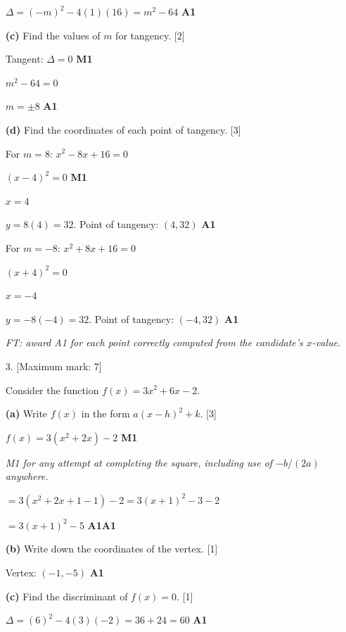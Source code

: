\documentclass[12pt, twoside]{article}
\begin{document}
\begin{enumerate}[itemsep=0.3cm]
$\Delta = (-m)^2 - 4(1)(16) = m^2 - 64$ \hfill \textbf{A1}

\medskip

\textbf{(c)} Find the values of $m$ for tangency. \hfill [2]

Tangent: $\Delta = 0$ \hfill \textbf{M1}

$m^2 - 64 = 0$

$m = \pm 8$ \hfill \textbf{A1}

\medskip

\textbf{(d)} Find the coordinates of each point of tangency. \hfill [3]

For $m = 8$: $x^2 - 8x + 16 = 0$

$(x - 4)^2 = 0$ \hfill \textbf{M1}

$x = 4$

$y = 8(4) = 32$. \quad Point of tangency: $(4, 32)$ \hfill \textbf{A1}

For $m = -8$: $x^2 + 8x + 16 = 0$

$(x + 4)^2 = 0$

$x = -4$

$y = -8(-4) = 32$. \quad Point of tangency: $(-4, 32)$ \hfill \textbf{A1}

\emph{FT: award A1 for each point correctly computed from the candidate's $x$-value.}

\newpage

\item[3.] [Maximum mark: 7]

Consider the function $f(x) = 3x^2 + 6x - 2$.

\medskip

\textbf{(a)} Write $f(x)$ in the form $a(x - h)^2 + k$. \hfill [3]

$f(x) = 3(x^2 + 2x) - 2$ \hfill \textbf{M1}

\emph{M1 for any attempt at completing the square, including use of $-b/(2a)$ anywhere.}

$= 3(x^2 + 2x + 1 - 1) - 2 = 3(x + 1)^2 - 3 - 2$

$= 3(x + 1)^2 - 5$ \hfill \textbf{A1A1}

\medskip

\textbf{(b)} Write down the coordinates of the vertex. \hfill [1]

Vertex: $(-1, -5)$ \hfill \textbf{A1}

\medskip

\textbf{(c)} Find the discriminant of $f(x) = 0$. \hfill [1]

$\Delta = (6)^2 - 4(3)(-2) = 36 + 24 = 60$ \hfill \textbf{A1}


\end{enumerate}
\end{document}
